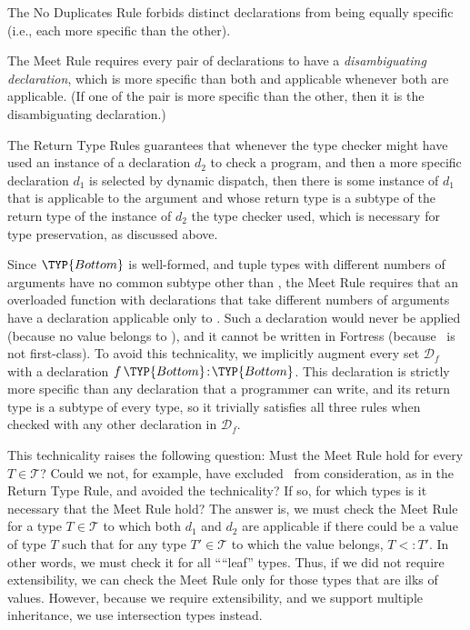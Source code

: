 \documentclass[10pt]{sigplanconf}
\newcommand{\subtypeof}{\ensuremath{<:}}
\newcommand{\decl}[3]{\mbox{\ensuremath{{#1}\,{#2}\!:\!{#3}}}}
\newcommand{\T}{\ensuremath{\mathcal{T}}}
\newcommand{\D}{\ensuremath{\mathcal{D}}}
\newcommand{\Df}[1][f]{\D_{\!#1}}
\newcommand{\Bottom}{\TYP{Bottom}}
\begin{document}
The No Duplicates Rule forbids distinct declarations from being equally specific 
(i.e., each more specific than the other).

The Meet Rule requires every pair of declarations 
to have a \emph{disambiguating declaration}, 
which is more specific than both 
and applicable whenever both are applicable.
(If one of the pair is more specific than the other, 
then it is the disambiguating declaration.)

The Return Type Rules guarantees that
whenever the type checker might have used an instance of a declaration $d_2$ 
to check a program,
and then a more specific declaration $d_1$ is selected by dynamic dispatch,
then there is some instance of $d_1$ that is applicable to the argument 
and whose return type is a subtype 
of the return type of the instance of $d_2$ 
the type checker used, 
which is necessary for type preservation, 
as discussed above.

Since $\Bottom$ is well-formed, 
and tuple types with different numbers of arguments 
have no common subtype other than \Bottom,
the Meet Rule requires that 
an overloaded function with declarations that take different numbers of arguments 
have a declaration applicable only to \Bottom.
Such a declaration would never be applied 
(because no value belongs to \Bottom), 
and it cannot be written in Fortress 
(because \Bottom\ is not first-class).
To avoid this technicality, 
we implicitly augment every set $\Df$ 
with a declaration $\decl{f}{\Bottom}{\Bottom}$.
This declaration is strictly more specific 
than any declaration that a programmer can write,
and its return type is a subtype of every type, 
so it trivially satisfies all three rules 
when checked with any other declaration in $\Df$.

This technicality raises the following question:
Must the Meet Rule hold for every $T \in \T$?
Could we not, for example, 
have excluded \Bottom\ from consideration, 
as in the Return Type Rule, 
and avoided the technicality?
If so, 
for which types is it necessary that the Meet Rule hold?
The answer is,
we must check the Meet Rule for a type $T \in \T$ 
to which both $d_1$ and $d_2$ are applicable
if there could be a value of type $T$ 
such that for any type $T' \in \T$ 
to which the value belongs, $T \subtypeof T'$.
In other words, 
we must check it for all ````leaf'' types.
Thus, if we did not require extensibility, 
we can check the Meet Rule only for those types that are ilks of values.
However, 
because we require extensibility, 
and we support multiple inheritance,
we use intersection types instead.
\end{document}
